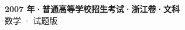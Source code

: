 \documentclass[zihao=-4, a4paper]{ctexart}
\begin{document}
\begin{center}
  {\Large\bfseries 2007 年·普通高等学校招生考试·浙江卷·文科}\\[4pt]
  {\large 数学 · 试题版}
\end{center}
\medskip
{}

\end{document}
